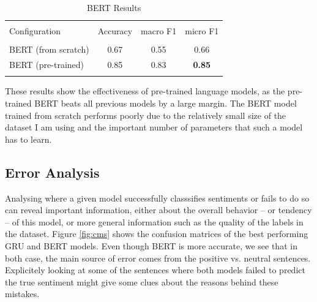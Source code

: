 \documentclass[final]{cvpr}
\begin{document}
\begin{table}[h!]
	\begin{center}
		\begin{tabular}{ l c c c  } 
			\hline
			\\ [-1.7mm] 
			Configuration & Accuracy & macro F1 & micro F1 \\ [0.7mm] 
			\hline
			\\ [-1.5mm] 
			BERT (from scratch) & 0.67 & 0.55 & 0.66 \\
			BERT (pre-trained) & 0.85 & 0.83 & \textbf{0.85} \\ [0.5mm] 
			\hline
			\\ [-2.6mm] 
		\end{tabular}
		\caption{BERT Results}
		\label{tab:bert}
	\end{center}
\end{table}

\vspace{-2mm}	

These results show the effectiveness of pre-trained language models, as the pre-trained BERT beats all previous models by a large margin. The BERT model trained from scratch performs poorly due to the relatively small size of the dataset I am using and the important number of parameters that such a model has to learn.

\subsection{Error Analysis}

Analysing where a given model successfully classsifies sentiments or fails to do so can reveal important information, either about the overall behavior -- or tendency -- of this model, or more general information such as the quality of the labels in the dataset. Figure \ref{fig:cms} shows the confusion matrices of the best performing GRU and BERT models. Even though BERT is more accurate, we see that in both case, the main source of error comes from the positive vs. neutral sentences. Explicitely looking at some of the sentences where both models failed to predict the true sentiment might give some clues about the reasons behind these mistakes.
\end{document}
